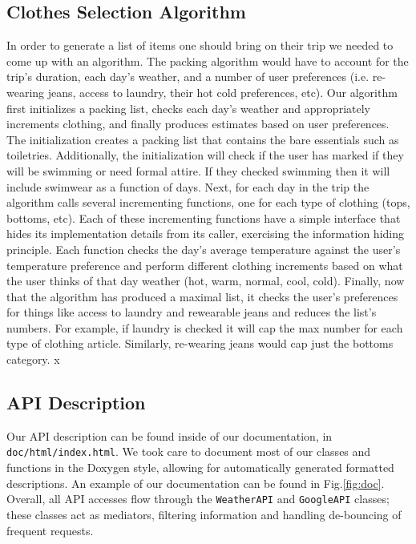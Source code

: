 \documentclass[11pt]{article}
\begin{document}
    \subsection{Clothes Selection Algorithm}
    In order to generate a list of items one should bring on their trip we needed to come up with an algorithm. The packing algorithm would have to account for the trip's duration, each day's weather, and a number of user preferences (i.e. re-wearing jeans, access to laundry, their hot cold preferences, etc). Our algorithm first initializes a packing list, checks each day's weather and appropriately increments clothing, and finally produces estimates based on user preferences. The initialization creates a packing list that contains the bare essentials such as toiletries. Additionally, the initialization will check if the user has marked if they will be swimming or need formal attire. If they checked swimming then it will include swimwear as a function of days. Next, for each day in the trip the algorithm calls several incrementing functions, one for each type of clothing (tops, bottoms, etc). Each of these incrementing functions have a simple interface that hides its implementation details from its caller, exercising the information hiding principle. Each function checks the day's average temperature against the user's temperature preference and perform different clothing increments based on what the user thinks of that day weather (hot, warm, normal, cool, cold). Finally, now that the algorithm has produced a maximal list, it checks the user's preferences for things like access to laundry and rewearable jeans and reduces the list's numbers. For example, if laundry is checked it will cap the max number for each type of clothing article. Similarly, re-wearing jeans would cap just the bottoms category. x

    \subsection{API Description}
    Our API description can be found inside of our documentation, in \texttt{doc/html/index.html}. We took care to document most of our classes and functions in the Doxygen style, allowing for automatically generated formatted descriptions. An example of our documentation can be found in Fig.\ref{fig:doc}. Overall, all API accesses flow through the \texttt{WeatherAPI} and \texttt{GoogleAPI} classes; these classes act as mediators, filtering information and handling de-bouncing of frequent requests. 
\end{document}
